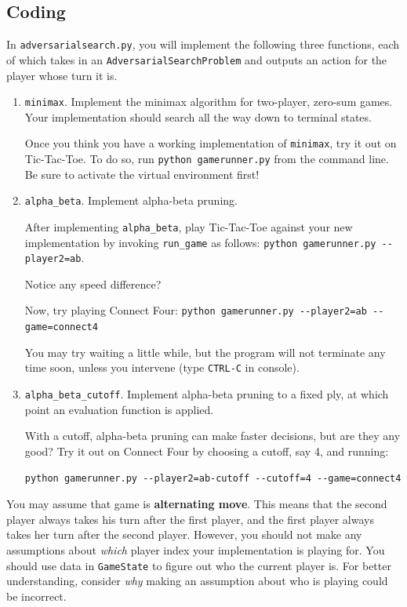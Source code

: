 \documentclass{article}
\begin{document}
\subsection{Coding}
In \verb|adversarialsearch.py|, you will implement the following three functions,
each of which takes in an \verb|AdversarialSearchProblem| and outputs an action for the player whose turn it is.

\begin{enumerate}
\item \verb|minimax|. Implement the minimax algorithm for two-player, zero-sum games.
  Your implementation should search all the way down to terminal states.

  Once you think you have a working implementation of \verb|minimax|, try it out on Tic-Tac-Toe.
  To do so, run \verb|python gamerunner.py| from the command line. Be sure to activate the virtual environment first!

\item \verb|alpha_beta|. Implement alpha-beta pruning.

  After implementing \verb|alpha_beta|,
  play Tic-Tac-Toe against your new implementation by invoking \verb|run_game| as follows:
  \verb|python gamerunner.py --player2=ab|.

  Notice any speed difference?

  Now, try playing Connect Four:
  \verb|python gamerunner.py --player2=ab --game=connect4|

  You may try waiting a little while, but the program will not terminate any time soon, unless you intervene
  (type \verb|CTRL-C| in console).

\item \verb|alpha_beta_cutoff|. Implement alpha-beta pruning to a fixed ply, at which point an
  evaluation function is applied.

  With a cutoff, alpha-beta pruning can make faster decisions, but are they any good?
  Try it out on Connect Four by choosing a cutoff, say 4, and running:

  \verb|python gamerunner.py --player2=ab-cutoff --cutoff=4 --game=connect4|
\end{enumerate}

You may assume that game is \textbf{alternating move}. This means that the second player always takes his turn after the first player, and the first player always takes her turn after the second player. However, you should not make any assumptions about \textit{which} player index your implementation is playing for. You should use data in \verb|GameState| to figure out who the current player is. For better understanding, consider \textit{why} making an assumption about who is playing could be incorrect.
\end{document}
